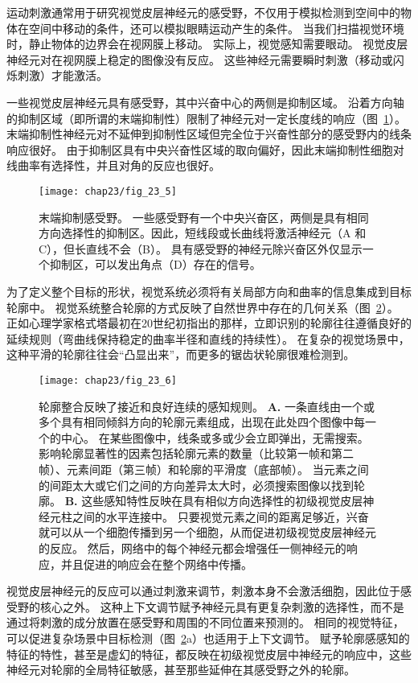 运动刺激通常用于研究视觉皮层神经元的感受野，不仅用于模拟检测到空间中的物体在空间中移动的条件，还可以模拟眼睛运动产生的条件。
当我们扫描视觉环境时，静止物体的边界会在视网膜上移动。
实际上，视觉感知需要眼动。
视觉皮层神经元对在视网膜上稳定的图像没有反应。
这些神经元需要瞬时刺激（移动或闪烁刺激）才能激活。


一些视觉皮层神经元具有感受野，其中兴奋中心的两侧是抑制区域。
沿着方向轴的抑制区域（即所谓的末端抑制性）限制了神经元对一定长度线的响应（图~\ref{fig:23_5}）。
末端抑制性神经元对不延伸到抑制性区域但完全位于兴奋性部分的感受野内的线条响应很好。
由于抑制区具有中央兴奋性区域的取向偏好，因此末端抑制性细胞对线曲率有选择性，并且对角的反应也很好。


\begin{figure}[htbp]
	\centering
	\texttt{[image: chap23/fig\_23\_5]}
	\caption{末端抑制感受野。
		一些感受野有一个中央兴奋区，两侧是具有相同方向选择性的抑制区。因此，短线段或长曲线将激活神经元（A 和 C），但长直线不会（B）。
		具有感受野的神经元除兴奋区外仅显示一个抑制区，可以发出角点（D）存在的信号。}
	\label{fig:23_5}
\end{figure}


为了定义整个目标的形状，视觉系统必须将有关局部方向和曲率的信息集成到目标轮廓中。
视觉系统整合轮廓的方式反映了自然世界中存在的几何关系（图~\ref{fig:23_6}）。
正如心理学家格式塔最初在20世纪初指出的那样，立即识别的轮廓往往遵循良好的延续规则（弯曲线保持稳定的曲率半径和直线的持续性）。
在复杂的视觉场景中，这种平滑的轮廓往往会“凸显出来”，而更多的锯齿状轮廓很难检测到。


\begin{figure}[htbp]
	\centering
	\texttt{[image: chap23/fig\_23\_6]}
	\caption{轮廓整合反映了接近和良好连续的感知规则\cite{li2002global}。
		\textbf{A.} 一条直线由一个或多个具有相同倾斜方向的轮廓元素组成，出现在此处四个图像中每一个的中心。
		在某些图像中，线条或多或少会立即弹出，无需搜索。
		影响轮廓显著性的因素包括轮廓元素的数量（比较第一帧和第二帧）、元素间距（第三帧）和轮廓的平滑度（底部帧）。
		当元素之间的间距太大或它们之间的方向差异太大时，必须搜索图像以找到轮廓。
		\textbf{B.} 这些感知特性反映在具有相似方向选择性的初级视觉皮层神经元柱之间的水平连接中。
		只要视觉元素之间的距离足够近，兴奋就可以从一个细胞传播到另一个细胞，从而促进初级视觉皮层神经元的反应。
		然后，网络中的每个神经元都会增强任一侧神经元的响应，并且促进的响应会在整个网络中传播。}
	\label{fig:23_6}
\end{figure}


视觉皮层神经元的反应可以通过刺激来调节，刺激本身不会激活细胞，因此位于感受野的核心之外。
这种上下文调节赋予神经元具有更复杂刺激的选择性，而不是通过将刺激的成分放置在感受野和周围的不同位置来预测的。
相同的视觉特征，可以促进复杂场景中目标检测（图~\ref{fig:23_6}a）也适用于上下文调节。
赋予轮廓感感知的特征的特性，甚至是虚幻的特征，都反映在初级视觉皮层中神经元的响应中，这些神经元对轮廓的全局特征敏感，甚至那些延伸在其感受野之外的轮廓。


